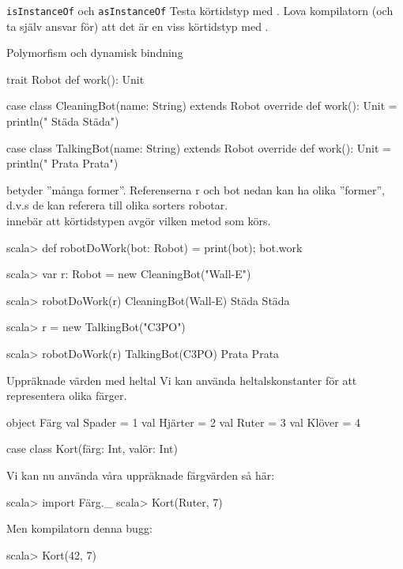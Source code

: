 \begin{Slide}{\texttt{isInstanceOf} och \texttt{asInstanceOf}}\SlideFontTiny
Testa körtidstyp med . Lova kompilatorn (och ta själv ansvar för) att det är en viss körtidstyp med .
\end{Slide}



\begin{Slide}{Polymorfism och dynamisk bindning}\SlideFontTiny
\begin{Code}[basicstyle=\SlideFontSize{6.2}{7.5}\ttfamily\selectfont]
trait Robot { def work(): Unit }

case class CleaningBot(name: String) extends Robot {
  override def work(): Unit = println(" Städa Städa")
}

case class TalkingBot(name: String) extends Robot {
  override def work(): Unit = println(" Prata Prata")
}
\end{Code}
 betyder ''många former''. Referenserna r och bot nedan kan ha olika ''former'', d.v.s de kan referera till olika sorters robotar. \\  innebär att körtidstypen avgör vilken metod som körs.
\begin{REPL}[basicstyle=\color{white}\SlideFontSize{6.2}{7.5}\ttfamily\selectfont]
scala> def robotDoWork(bot: Robot) = { print(bot); bot.work }

scala> var r: Robot = new CleaningBot("Wall-E")

scala> robotDoWork(r)
CleaningBot(Wall-E) Städa Städa

scala> r = new TalkingBot("C3PO")

scala> robotDoWork(r)
TalkingBot(C3PO) Prata Prata
\end{REPL}
\end{Slide}



\begin{Slide}{Uppräknade värden med heltal}\SlideFontSmall
Vi kan använda heltalskonstanter för att representera olika färger.
\begin{Code}
object Färg {
  val Spader = 1
  val Hjärter = 2
  val Ruter = 3
  val Klöver = 4
}
\end{Code}
\begin{Code}[language=,keywords={case,class}]
case class Kort(färg: Int, valör: Int)
\end{Code}

Vi kan nu använda våra uppräknade färgvärden så här:
\begin{REPL}
scala> import Färg._
scala> Kort(Ruter, 7)
\end{REPL}
\pause Men kompilatorn  denna bugg:
\begin{REPL}
scala> Kort(42, 7)
\end{REPL}

\end{Slide}



